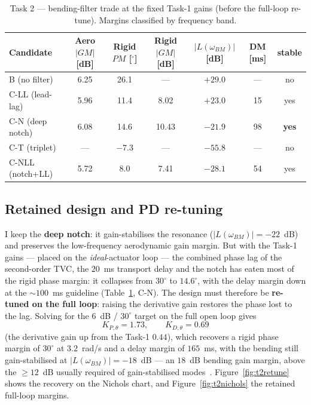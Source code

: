 \documentclass[../main.tex]{subfiles}
\begin{document}
\begin{table}[H]
\centering
\caption{Task 2 --- bending-filter trade at the fixed Task-1 gains (before the
full-loop re-tune). Margins classified by frequency band.}
\label{tab:filters}
\footnotesize
\setlength{\tabcolsep}{4pt}
\begin{tabular}{lcccccc}
\toprule
Candidate & Aero $|GM|$ [dB] & Rigid $PM$ [$^\circ$] & Rigid $|GM|$ [dB] & $|L(\omega_{BM})|$ [dB] & DM [ms] & stable \\
\midrule
B (no filter)      & 6.25 & 26.1  & ---   & $+29.0$ & ---  & no \\
C-LL (lead-lag)    & 5.96 & 11.4  & 8.02  & $+23.0$ & 15   & yes \\
C-N (deep notch)   & 6.08 & 14.6  & 10.43 & $-21.9$ & 98   & \textbf{yes} \\
C-T (triplet)      & ---  & $-7.3$ & ---  & $-55.8$ & ---  & no \\
C-NLL (notch+LL)   & 5.72 & 8.0   & 7.41  & $-28.1$ & 54   & yes \\
\bottomrule
\end{tabular}
\end{table}

\subsection{Retained design and PD re-tuning}

I keep the \textbf{deep notch}: it gain-stabilises the resonance
($|L(\omega_{BM})| = -22$~dB) and preserves the low-frequency aerodynamic gain
margin. But with the Task-1 gains --- placed on the \emph{ideal}-actuator loop
--- the combined phase lag of the second-order TVC, the $20$~ms transport delay
and the notch has eaten most of the rigid phase margin: it collapses from
$30^\circ$ to $\mathbf{14.6^\circ}$, with the delay margin down at the
$\sim100$~ms guideline (Table~\ref{tab:filters}, C-N). The design must therefore
be \textbf{re-tuned on the full loop}: raising the derivative gain restores the
phase lost to the lag. Solving for the $6$~dB / $30^\circ$ target on the full
open loop gives
\begin{equation}
K_{P,\theta} = 1.73,\qquad K_{D,\theta} = 0.69
\end{equation}
(the derivative gain up from the Task-1 $0.44$), which recovers a rigid phase
margin of $30^\circ$ at $3.2$~rad/s and a delay margin of $165$~ms, with the
bending still gain-stabilised at $|L(\omega_{BM})| = -18$~dB --- an $18$~dB
bending gain margin, above the $\ge 12$~dB usually required of gain-stabilised
modes~\cite{greensite_cr826}. Figure~\ref{fig:t2retune} shows the recovery on the
Nichols chart, and Figure~\ref{fig:t2nichols} the retained full-loop margins.
\end{document}
